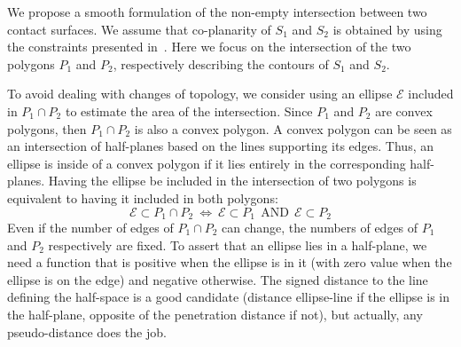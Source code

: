 We propose a smooth formulation of the non-empty intersection between two contact surfaces.
We assume that co-planarity of $S_1$ and $S_2$ is obtained by using the constraints presented in~.
Here we focus on the intersection of the two polygons $P_1$ and $P_2$, respectively describing the contours of $S_1$ and $S_2$.

To avoid dealing with changes of topology, we consider using an ellipse $\mathcal{E}$ included in $P_1 \cap P_2$ to estimate the area of the intersection.
Since $P_1$ and $P_2$ are convex polygons, then $P_1 \cap P_2$ is also a convex polygon.
A convex polygon can be seen as an intersection of half-planes based on the lines supporting its edges.
Thus, an ellipse is inside of a convex polygon if it lies entirely in the corresponding half-planes.
Having the ellipse be included in the intersection of two polygons is equivalent to having it included in both polygons:
\begin{equation}
\mathcal{E} \subset P_1 \cap P_2 \ \Longleftrightarrow \
\mathcal{E} \subset P_1 \ \ \text{AND} \ \  \mathcal{E} \subset P_2
\end{equation}
Even if the number of edges of $P_1 \cap P_2$ can change, the numbers of edges of $P_1$ and $P_2$ respectively are fixed.
To assert that an ellipse lies in a half-plane, we need a function that is positive when the ellipse is in it (with zero value when the ellipse is on the edge) and negative otherwise.
The signed distance to the line defining the half-space is a good candidate (distance ellipse-line if the ellipse is in the half-plane, opposite of the penetration distance if not), but actually, any pseudo-distance does the job.
